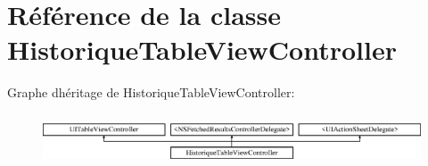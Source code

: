 \hypertarget{interface_historique_table_view_controller}{}\section{Référence de la classe Historique\+Table\+View\+Controller}
\label{interface_historique_table_view_controller}
Graphe d\textquotesingle{}héritage de Historique\+Table\+View\+Controller\+:\begin{figure}[H]
\begin{center}
\leavevmode
\includegraphics[height=1.536351cm]{interface_historique_table_view_controller}
\end{center}
\end{figure}
